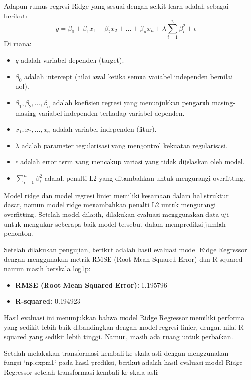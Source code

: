 Adapun rumus regresi Ridge yang sesuai dengan scikit-learn adalah sebagai berikut:
\begin{equation}
    y = \beta_0 + \beta_1 x_1 + \beta_2 x_2 + ... + \beta_n x_n + \lambda \sum_{i=1}^{n} \beta_i^2 + \epsilon
\end{equation}
Di mana:
\begin{itemize}
    \item $y$ adalah variabel dependen (target).
    \item $\beta_0$ adalah intercept (nilai awal ketika semua variabel independen bernilai nol).
    \item $\beta_1, \beta_2, ..., \beta_n$ adalah koefisien regresi yang menunjukkan pengaruh masing-masing variabel independen terhadap variabel dependen.
    \item $x_1, x_2, ..., x_n$ adalah variabel independen (fitur).
    \item $\lambda$ adalah parameter regularisasi yang mengontrol kekuatan regularisasi.
    \item $\epsilon$ adalah error term yang mencakup variasi yang tidak dijelaskan oleh model.
    \item $\sum_{i=1}^{n} \beta_i^2$ adalah penalti L2 yang ditambahkan untuk mengurangi overfitting.
\end{itemize}

Model ridge dan model regresi linier memiliki kesamaan dalam hal struktur dasar, namun model ridge menambahkan penalti L2 untuk mengurangi overfitting. Setelah model dilatih, dilakukan evaluasi menggunakan data uji untuk mengukur seberapa baik model tersebut dalam memprediksi jumlah penonton.

Setelah dilakukan pengujian, berikut adalah hasil evaluasi model Ridge Regressor dengan menggunakan metrik RMSE (Root Mean Squared Error) dan R-squared namun masih berskala log1p:

\begin{itemize}
    \item \textbf{RMSE (Root Mean Squared Error):} 1.195796
    \item \textbf{R-squared:} 0.194923
\end{itemize}

Hasil evaluasi ini menunjukkan bahwa model Ridge Regressor memiliki performa yang sedikit lebih baik dibandingkan dengan model regresi linier, dengan nilai R-squared yang sedikit lebih tinggi. Namun, masih ada ruang untuk perbaikan.

Setelah melakukan transformasi kembali ke skala asli dengan menggunakan fungsi `np.expm1` pada hasil prediksi, berikut adalah hasil evaluasi model Ridge Regressor setelah transformasi kembali ke skala asli:

